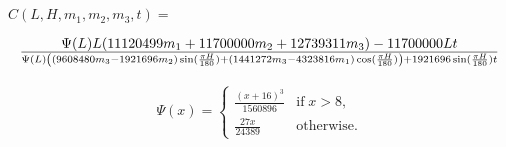 \documentclass{article}
\begin{document}
$\hat C(L, H, m_1, m_2, m_3, t) =$

$$
       \Psi(L) L (11120499 m_1 + 11700000 m_2 + 12739311 m_3) - 11700000 L t
  \over
       \Psi(L) \left((9608480m_3-1921696 m_2)\sin({\pi H\over 180}) +
        (1441272 m_3 - 4323816 m_1)\cos ({\pi H \over 180})\right) + 1921696\sin ({\pi H\over 180}) t
$$

\begin{align*}
\Psi(x)=
\begin{cases}
    \frac{(x+16)^3}{1560896} & \mathrm{if}\;x>8, \\
    \frac{27x}{24389} & \mathrm{otherwise.}
\end{cases}
\end{align*}
\end{document}
